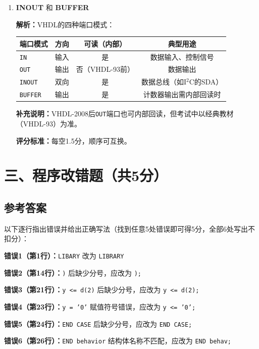 \begin{enumerate}[label=\arabic*., leftmargin=*]
\noindent\textbf{评分标准：}每空1.5分。注意包名的完整写法。


\item \textbf{INOUT} 和 \textbf{BUFFER}

\noindent\textbf{解析：}VHDL的四种端口模式：

\begin{table}[h]
\centering
\begin{tabular}{|l|c|c|c|}
\hline
\textbf{端口模式} & \textbf{方向} & \textbf{可读（内部）} & \textbf{典型用途} \\
\hline
\texttt{IN}    & 输入   & 是 & 数据输入、控制信号 \\
\hline
\texttt{OUT}   & 输出   & 否（VHDL-93前） & 数据输出 \\
\hline
\texttt{INOUT} & 双向   & 是 & 数据总线（如I$^2$C的SDA） \\
\hline
\texttt{BUFFER}& 输出   & 是 & 计数器输出需内部回读时 \\
\hline
\end{tabular}
\end{table}

\noindent\textbf{补充说明：}VHDL-2008后\texttt{OUT}端口也可内部回读，但考试中以经典教材（VHDL-93）为准。

\noindent\textbf{评分标准：}每空1.5分，顺序可互换。

\end{enumerate}

\newpage
\section{三、程序改错题（共5分）}

\subsection*{参考答案}

\noindent 以下逐行指出错误并给出正确写法（找到任意5处错误即可得5分，全部6处写出不扣分）：

\medskip
\begin{framed}
\noindent\textbf{错误1（第1行）：}\texttt{LIBARY} 改为 \texttt{LIBRARY}

\textbf{错误2（第14行）：}\texttt{)} 后缺少分号，应改为 \texttt{);}

\textbf{错误3（第21行）：}\texttt{y <= d(2)} 后缺少分号，应改为 \texttt{y <= d(2);}

\textbf{错误4（第23行）：}\texttt{y = '0'} 赋值符号错误，应改为 \texttt{y <= '0';}

\textbf{错误5（第24行）：}\texttt{END CASE} 后缺少分号，应改为 \texttt{END CASE;}

\textbf{错误6（第26行）：}\texttt{END behavior} 结构体名称不匹配，应改为 \texttt{END behav;}
\end{framed}

